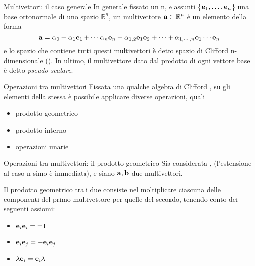 \begin{frame}{Multivettori: il caso generale}
    In generale fissato un n, e assunti \{\(\mathbf{e}_{1}, \ldots, \mathbf{e}_{n}\)\}
    una base ortonormale di uno spazio \(\mathbb{R}^{n}\),
    un multivettore \(\mathbf{a} \in \mathbb{R}^{n}\) è un elemento della forma
    \[
        \mathbf{a} = \alpha_{0} + \alpha_{1}\mathbf{e}_{1} + \cdots \alpha_{n}\mathbf{e}_{n}
            + \alpha_{1,2}\mathbf{e}_{1}\mathbf{e}_{2} + \cdots 
            + \alpha_{1, \cdots, n}\mathbf{e}_{1} \cdots \mathbf{e}_{n}
    \]
    e lo spazio che contiene tutti questi multivettori è detto spazio di Clifford
    n-dimensionale (\Clifford). 
    In ultimo, il multivettore dato dal prodotto di ogni vettore base è detto
    \emph{pseudo-scalare}.
\end{frame}
\begin{frame}{Operazioni tra multivettori}
    Fissata una qualche algebra di Clifford \Clifford, 
    su gli elementi della stessa è possibile applicare diverse operazioni,
    quali 
    \begin{itemize}
        \item prodotto geometrico
        \item prodotto interno
        \item operazioni unarie
    \end{itemize}
\end{frame}
\begin{frame}{Operazioni tra multivettori: il prodotto geometrico}
    Sia considerata \Clifford[2], (l'estensione al caso n-simo è immediata),
    e siano \(\mathbf{a}, \mathbf{b}\) due multivettori.

    Il prodotto geometrico tra i due consiste nel moltiplicare ciascuna delle 
    componenti del primo multivettore per quelle del secondo, 
    tenendo conto dei seguenti assiomi:
    \begin{itemize}
        \item \(\mathbf{e}_{i}\mathbf{e}_{i} = \pm 1\)
        \item \(\mathbf{e}_{i}\mathbf{e}_{j} = -\mathbf{e}_{i}\mathbf{e}_{j}\)
        \item \(\lambda\mathbf{e}_{i} = \mathbf{e}_{i}\lambda\)
    \end{itemize}
\end{frame}
